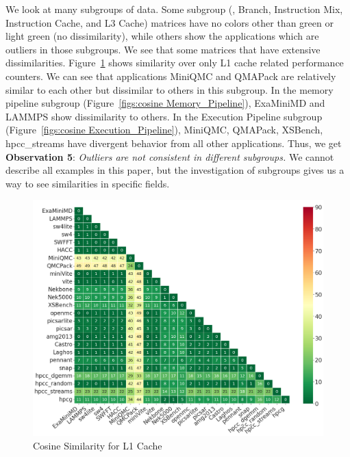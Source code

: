 We look at many subgroups of data. Some subgroup (\eg, Branch, Instruction Mix, Instruction Cache, and L3 Cache) matrices have no colors other than green or light green (no dissimilarity), while others show the applications which are outliers in those subgroups. We see that some matrices that have extensive dissimilarities. Figure~\ref{figs:cosine L1_D_Cache} shows similarity over only L1 cache related performance counters. We can see that applications MiniQMC and QMAPack are relatively
similar to each other but dissimilar to others in this subgroup. In the memory pipeline subgroup (Figure~\ref{figs:cosine Memory_Pipeline}), ExaMiniMD and LAMMPS show dissimilarity to others. In the Execution Pipeline subgroup (Figure~\ref{figs:cosine Execution_Pipeline}), MiniQMC, QMAPack, XSBench, hpcc\_streams have divergent behavior from all other applications. Thus, we get \textbf{Observation 5}: \textit{Outliers are not consistent in different subgroups.}
We cannot describe all examples in this paper, but the investigation of subgroups gives us a way to see similarities in specific fields.%

\begin{figure}[ht]
\centering
\includegraphics[width=0.9\linewidth]{figs/L1_Cache_font20.png}
\caption{Cosine Similarity for L1 Cache }
\label{figs:cosine L1_D_Cache}
\end{figure}

